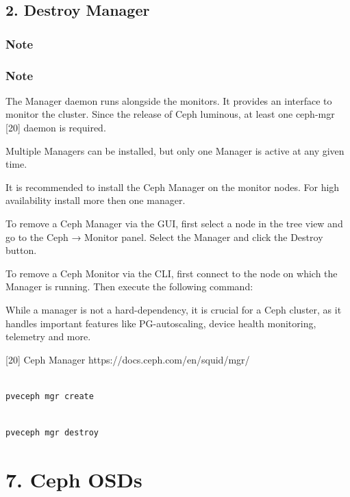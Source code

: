 \subsection{2. Destroy Manager}

\subsubsection{Note}

\subsubsection{Note}

The Manager daemon runs alongside the monitors. It provides an interface to monitor the cluster. Since the release of Ceph luminous, at least one ceph-mgr [20] daemon is required.

Multiple Managers can be installed, but only one Manager is active at any given time.

It is recommended to install the Ceph Manager on the monitor nodes. For high availability install more then one manager.

To remove a Ceph Manager via the GUI, first select a node in the tree view and go to the Ceph → Monitor panel. Select the Manager and click the Destroy button.

To remove a Ceph Monitor via the CLI, first connect to the node on which the Manager is running. Then execute the following command:

While a manager is not a hard-dependency, it is crucial for a Ceph cluster, as it handles important features like PG-autoscaling, device health monitoring, telemetry and more.

[20] Ceph Manager https://docs.ceph.com/en/squid/mgr/

\begin{lstlisting}

pveceph mgr create

\end{lstlisting}

\begin{lstlisting}

pveceph mgr destroy

\end{lstlisting}


\section{7. Ceph OSDs}


